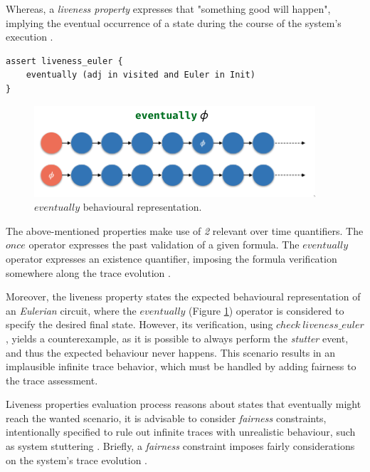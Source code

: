 Whereas, a \textit{liveness property} expresses that "something good will happen", implying the eventual occurrence of a state during the course of the system's execution \cite{lamport1977proving}.

\begin{lstlisting}[title={\textit{Liveness Property}: Eventually the graph will represent an \textit{Eulerian} circuit.}, otherkeywords = {assert, eventually, in, and}]
assert liveness_euler {
    eventually (adj in visited and Euler in Init)
} 
\end{lstlisting}

\begin{figure}[H]
    \centering
    \includegraphics[width=0.6\linewidth]{images/alloy_eventually.png}
    \caption{$eventually$ behavioural representation.}
    \label{fig:alloy-eventually}
\end{figure}

The above-mentioned properties make use of \textit{2} relevant over time quantifiers. The $once$ operator expresses the past validation of a given formula. The $eventually$ operator expresses an existence quantifier, imposing the formula verification somewhere along the trace evolution \cite{alloy-docs}.

Moreover, the liveness property states the expected behavioural representation of an \textit{Eulerian} circuit, where the $eventually$ (Figure \ref{fig:alloy-eventually}) operator is considered to specify the desired final state. However, its verification, using $check\ liveness\_euler$, yields a counterexample, as it is possible to always perform the \textit{stutter} event, and thus the expected behaviour never happens. This scenario results in an implausible infinite trace behavior, which must be handled by adding fairness to the trace assessment. 

Liveness properties evaluation process reasons about states that eventually might reach the wanted scenario, it is advisable to consider \textit{fairness} constraints, intentionally specified to rule out infinite traces with unrealistic behaviour, such as system stuttering \cite{baier2008principles}. Briefly, a \textit{fairness} constraint imposes fairly considerations on the system's trace evolution \cite{wahlfairness}.


